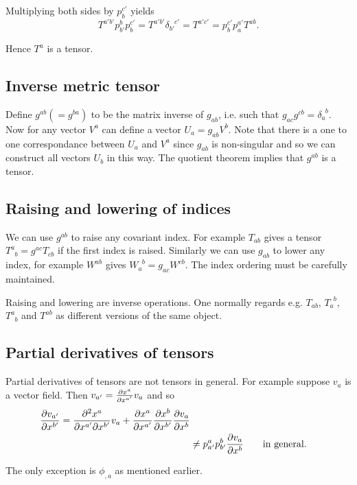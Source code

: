 \documentclass{notes}
\begin{document}
Multiplying both sides by $p_b^{c'}$ yields
\[
T^{a'b'} p^b_{b'} p^{c'}_b =T^{a'b'}
\delta^{\phantom{b'}c'}_{b'}
= T^{a'c'}= p^{c'}_b p^{a'}_a T^{ab}.
\]

Hence $T^{a}$ is a tensor.

\subsection{Inverse metric tensor}

Define $g^{ab} (=g^{ba})$ to be the matrix inverse of
$g_{ab}$, i.e.  such that $g_{ac}
g^{cb}=\delta_{a}^{\phantom{a}b}$.  Now for any vector
$V^a$ can define a vector $U_a=g_{ab} V^b$.  Note that there
is a one to one correspondance between $U_a$ and $V^a$ since
$g_{ab}$ is non-singular and so we can construct all vectors $U_b$
in this way.  The quotient theorem implies that $g^{ab}$ is a tensor.

\subsection{Raising and lowering of indices}

We can use $g^{ab}$ to raise any covariant index.  For example
$T_{ab}$ gives a tensor $T^a_{\phantom{a}b}= g^{ac}
T_{c b}$ if the first index is raised.  Similarly we can use
$g_{ab}$ to lower any index, for example $W^{ab}$ gives
$W^{\phantom{a}b}_a = g_{ac} W^{cb}$. The index
ordering must be carefully maintained.

Raising and lowering are inverse operations.  One normally regards
e.g. $T_{ab}$, $T_a^{\phantom{a}b}$,
$T^a_{\phantom{a}b}$ and $T^{ab}$ as different versions of
the same object.

\subsection{Partial derivatives of tensors}

Partial derivatives of tensors are not tensors in
general.  For example suppose $v_a$ is a vector field.
Then $v_{a'}= \frac{\partial x^a}{\partial x^{a'}} v_a$ and so
\begin{align*}
  \frac{\partial v_{a'}}{\partial x^{b'}} =\frac{\partial ^2x^a}{\partial x^{a'} \partial x^{b'}}
  v_a + \frac{\partial x^a}{\partial x^{a'}}\frac{\partial x^b}{\partial x^{b'}} \frac{\partial v_a}{\partial x^b}\\
  & \neq p^a_{a'} p^b_{b'} \frac{\partial v_a}{\partial x^b} \qquad \text{in general.}
\end{align*}

The only exception is $\phi_{,a}$ as mentioned earlier.
\end{document}

